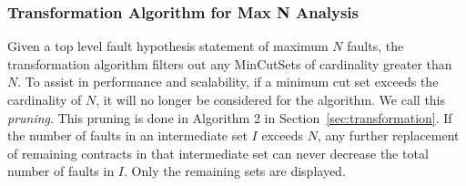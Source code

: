 \subsubsection{Transformation Algorithm for Max N Analysis}
Given a top level fault hypothesis statement of maximum $N$ faults, the transformation algorithm filters out any MinCutSets of cardinality greater than $N$. To assist in performance and scalability, if a minimum cut set exceeds the cardinality of $N$, it will no longer be considered for the algorithm. We call this \textit{pruning}. This pruning is done in Algorithm 2 in Section~\ref{sec:transformation}. If the number of faults in an intermediate set $I$ exceeds $N$, any further replacement of remaining contracts in that intermediate set can never decrease the total number of faults in $I$. Only the remaining sets are displayed. 










































